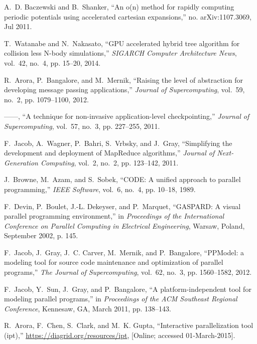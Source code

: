 \documentclass[draftclsnofoot]{elsarticle}
\begin{document}
\begin{thebibliography}{10}
A.~D. Baczewski and B.~Shanker, ``An o(n) method for rapidly computing periodic
  potentials using accelerated cartesian expansions,'' no. arXiv:1107.3069, Jul
  2011.

T.~Watanabe and N.~Nakasato, ``{GPU} accelerated hybrid tree algorithm for
  collision less {N}-body simulations,'' \emph{SIGARCH Computer Architecture
  News}, vol.~42, no.~4, pp. 15--20, 2014.

R.~Arora, P.~Bangalore, and M.~Mernik, ``Raising the level of abstraction for
  developing message passing applications,'' \emph{Journal of Supercomputing},
  vol.~59, no.~2, pp. 1079--1100, 2012.

------, ``A technique for non-invasive application-level checkpointing,''
  \emph{Journal of Supercomputing}, vol.~57, no.~3, pp. 227--255, 2011.

F.~Jacob, A.~Wagner, P.~Bahri, S.~Vrbsky, and J.~Gray, ``Simplifying the
  development and deployment of {M}ap{R}educe algorithms,'' \emph{Journal of
  Next-Generation Computing}, vol.~2, no.~2, pp. 123--142, 2011.

J.~Browne, M.~Azam, and S.~Sobek, ``{CODE}: {A} unified approach to parallel
  programming,'' \emph{IEEE Software}, vol.~6, no.~4, pp. 10--18, 1989.

F.~Devin, P.~Boulet, J.-L. Dekeyser, and P.~Marquet, ``{GASPARD}: {A} visual
  parallel programming environment,'' in \emph{Proceedings of the International
  Conference on Parallel Computing in Electrical Engineering}, Warsaw, Poland,
  September 2002, p. 145.

F.~Jacob, J.~Gray, J.~C. Carver, M.~Mernik, and P.~Bangalore, ``{PPModel}: a
  modeling tool for source code maintenance and optimization of parallel
  programs,'' \emph{The Journal of Supercomputing}, vol.~62, no.~3, pp.
  1560--1582, 2012.

F.~Jacob, Y.~Sun, J.~Gray, and P.~Bangalore, ``A platform-independent tool for
  modeling parallel programs,'' in \emph{Proceedings of the ACM Southeast
  Regional Conference}, Kennesaw, GA, March 2011, pp. 138--143.

R.~Arora, F.~Chen, S.~Clark, and M.~K. Gupta, ``Interactive parallelization
  tool (ipt),'' \url{https://diagrid.org/resources/ipt}, [Online; accessed
  01-March-2015].

\end{thebibliography}
\end{document}

